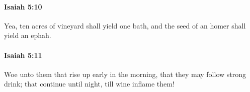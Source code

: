 		\paragraph{Isaiah 5:10} %
			\label{ISAIAH-5-10}

			Yea, ten acres of vineyard shall yield one bath, and the seed of an homer shall yield an ephah.


		\paragraph{Isaiah 5:11} %
			\label{ISAIAH-5-11}

			Woe unto them that rise up early in the morning, that they may follow strong drink; that continue until night, till wine inflame them!


